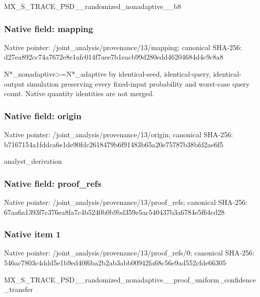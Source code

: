 \documentclass[10pt,a4paper]{article}
\begin{document}
\begingroup\raggedright\sloppy MX\_\allowbreak{}S\_\allowbreak{}TRACE\_\allowbreak{}PSD\_\allowbreak{}\_\allowbreak{}randomized\_\allowbreak{}nonadaptive\_\allowbreak{}\_\allowbreak{}b8\par\endgroup

\subsubsection{Native field: mapping}
Native pointer: /joint\_\allowbreak{}analysis/provenance/13/mapping; canonical SHA-256: d27ea892cc74a7672e8e1afc014f7aee7b1eacb99d280edd46204684d4c9c8a8

\begingroup\raggedright\sloppy N*\_\allowbreak{}nonadaptive>=\allowbreak{}N*\_\allowbreak{}adaptive by identical-seed,\allowbreak{} identical-query,\allowbreak{} identical-output simulation preserving every fixed-input probability and worst-case query count. Native quantity identities are not merged.\par\endgroup

\subsubsection{Native field: origin}
Native pointer: /joint\_\allowbreak{}analysis/provenance/13/origin; canonical SHA-256: b7167154a1fddca6e1de90fdc2618479b6f91483b65a20e75787b38bfd2ae6f5

\begingroup\raggedright\sloppy analyst\_\allowbreak{}derivation\par\endgroup

\subsubsection{Native field: proof\_\allowbreak{}refs}
Native pointer: /joint\_\allowbreak{}analysis/provenance/13/proof\_\allowbreak{}refs; canonical SHA-256: 67aa6a1393f7c376ea8fa7c4b5240b0b9bd359e5ac540437b3a6784e5f64cd28

\subsubsection{Native item 1}
Native pointer: /joint\_\allowbreak{}analysis/provenance/13/proof\_\allowbreak{}refs/0; canonical SHA-256: 546ac7803c4ddd5e1b9ed40f6ba2b2ab3abb00942fa68c56e9ad552cfde66305

\begingroup\raggedright\sloppy MX\_\allowbreak{}S\_\allowbreak{}TRACE\_\allowbreak{}PSD\_\allowbreak{}\_\allowbreak{}randomized\_\allowbreak{}nonadaptive\_\allowbreak{}\_\allowbreak{}proof\_\allowbreak{}uniform\_\allowbreak{}confidence\_\allowbreak{}transfer\par\endgroup
\end{document}

